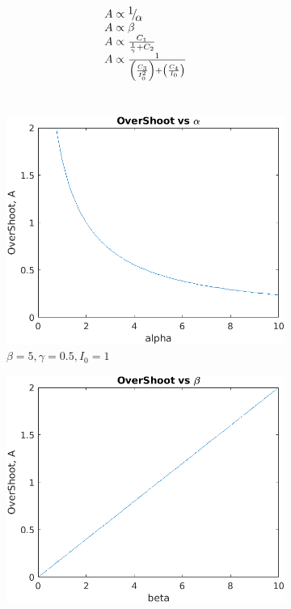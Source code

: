 \documentclass[12pt,letterpaper]{article}
\theoremstyle{definition}
\begin{document}
\[\begin{array}{l}
A \propto {\raise0.7ex\hbox{$1$} \!\mathord{\left/
 {\vphantom {1 \alpha }}\right.\kern-\nulldelimiterspace}
\!\lower0.7ex\hbox{$\alpha $}}\\
A \propto \beta \\
A \propto \frac{C_1}{\frac{1}{\gamma}+C_2} \\
A \propto \frac{1}{{\left( {\frac{{{C_3}}}{{I_0^2}}} \right) + \left( {\frac{{{C_4}}}{{{I_0}}}} \right)}}
\end{array}\]
\\
\begin{figure}[h]
     \centering
     \begin{subfigure}[b]{0.4\textwidth}
         \centering
         \includegraphics[width=\textwidth]{picture/Figure_1-2alpha.png}
         \caption{$\beta = 5, \gamma = 0.5, I_0 = 1$}
         \label{fig:y equals x}
     \end{subfigure}
     \begin{subfigure}[b]{0.4\textwidth}
         \centering
         \includegraphics[width=\textwidth]{picture/Figure_1-2beta.png}

\end{subfigure}
\end{figure}
\end{document}
